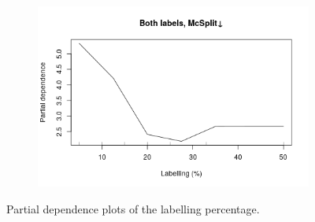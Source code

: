 \documentclass{l4proj}
\theoremstyle{definition}
\theoremstyle{remark}
\begin{document}
\begin{figure}
\begin{subfigure}[t]{0.49\textwidth}
    \includegraphics[width=\textwidth]{images/both_labels_mcsplitdown_labelling.png}
  \end{subfigure}
  \caption{Partial dependence plots of the labelling percentage.}
  \label{fig:labelling_partials}
\end{figure}
\end{document}
